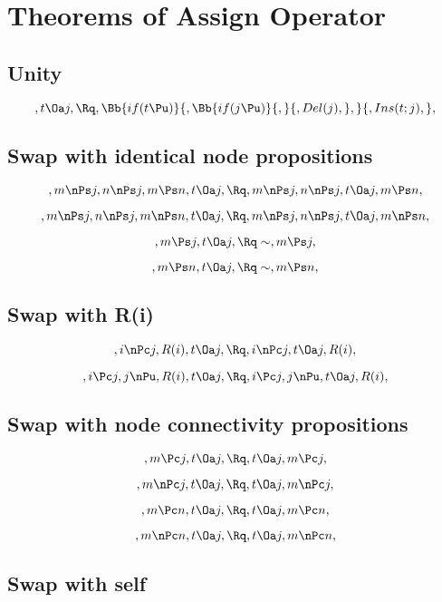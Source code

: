 \chapter{Theorems of Assign Operator}

\section{ Unity}
\[, t \Oa j, \Rq , \Bb{if(t \Pu)}{,\Bb{if(j \Pu)}{,}{, Del(j),}, }{, Ins(t;j),},\]



\bigskip
\bigskip
\section{Swap with identical node propositions }
\[, m \nPs j, n \nPs j, m \Ps n, t \Oa j, \Rq , m \nPs j, n \nPs j, t \Oa j, m \Ps n,\]

\[, m \nPs j, n \nPs j, m \nPs n, t \Oa j, \Rq , m \nPs j, n \nPs j, t \Oa j, m \nPs n,\]

\[, m \Ps j, t \Oa j, \Rq \sim, m \Ps j,\]

\[, m \Ps n, t \Oa j, \Rq \sim, m \Ps n,\]


\bigskip
\bigskip
\section{Swap with R(i) }
\[, i \nPc j, R(i), t \Oa j, \Rq , i \nPc j, t \Oa j, R(i),\]

\[, i \Pc j, j \nPu, R(i), t \Oa j, \Rq , i \Pc j, j \nPu, t \Oa j, R(i),\]



\bigskip
\bigskip
\section{Swap with node connectivity propositions }
\[, m \Pc j, t \Oa j, \Rq , t \Oa j, m \Pc j, \]

\[, m \nPc j, t \Oa j, \Rq , t \Oa j, m \nPc j, \]

\[, m \Pc n, t \Oa j, \Rq , t \Oa j, m \Pc n, \]

\[, m \nPc n, t \Oa j, \Rq , t \Oa j, m \nPc n, \]



\bigskip
\bigskip
\section{Swap with self }
